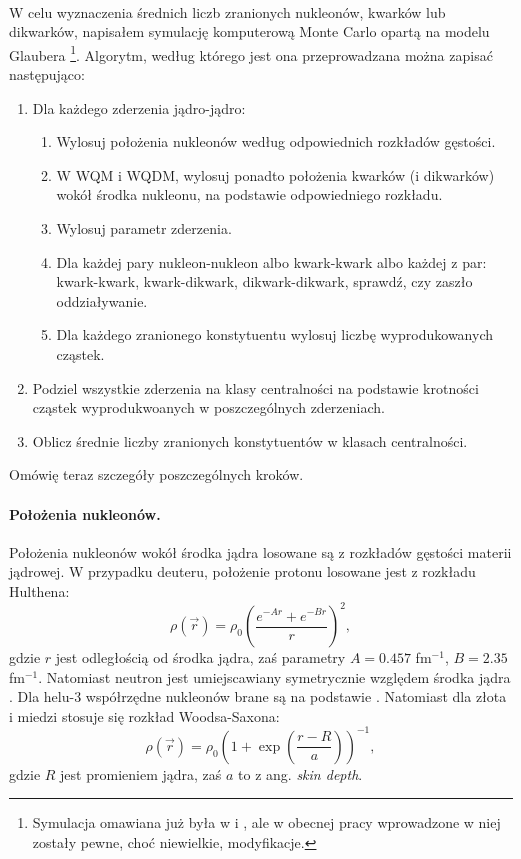 \documentclass[a4paper,12pt]{article}
\begin{document}
\paragraph{}
W celu wyznaczenia średnich liczb zranionych nukleonów, kwarków lub dikwarków, napisałem symulację komputerową Monte Carlo opartą na modelu Glaubera \cite{Loizides:2014vua} \footnote{Symulacja omawiana już była w \cite{Barej:pracaInz18} i \cite{Barej:2017kcw}, ale w obecnej pracy wprowadzone w niej zostały pewne, choć niewielkie, modyfikacje.}. Algorytm, według którego jest ona przeprowadzana można zapisać następująco:
\begin{enumerate}
	\item Dla każdego zderzenia jądro-jądro:
	\begin{enumerate}
		\item Wylosuj położenia nukleonów według odpowiednich rozkładów gęstości.
		\item W WQM i WQDM, wylosuj ponadto położenia kwarków (i dikwarków) wokół środka nukleonu, na podstawie odpowiedniego rozkładu.
		\item Wylosuj parametr zderzenia.
		\item Dla każdej pary nukleon-nukleon albo kwark-kwark albo każdej z par: kwark-kwark, kwark-dikwark, dikwark-dikwark, sprawdź, czy zaszło oddziaływanie.
		\item Dla każdego zranionego konstytuentu wylosuj liczbę wyprodukowanych cząstek.
	\end{enumerate}
	\item Podziel wszystkie zderzenia na klasy centralności na podstawie krotności cząstek wyprodukwoanych w poszczególnych zderzeniach.
	\item Oblicz średnie liczby zranionych konstytuentów w klasach centralności.
\end{enumerate}

Omówię teraz szczegóły poszczególnych kroków.

\paragraph{Położenia nukleonów.}
Położenia nukleonów wokół środka jądra losowane są z rozkładów gęstości materii jądrowej. W przypadku deuteru, położenie protonu losowane jest z rozkładu Hulthena:
\begin{equation}
\rho(\vec{r})=\rho_0 \left(\frac{e^{-Ar}+e^{-Br}}{r}\right)^2,
\end{equation}
gdzie $r$ jest odległością od środka jądra, zaś parametry $A=0.457$ fm$^{-1}$, $B=2.35$ fm$^{-1}$. Natomiast neutron jest umiejscawiany symetrycznie względem środka jądra \cite{hulthen,Loizides:2014vua}. Dla helu-3 współrzędne nukleonów brane są na podstawie \cite{Carlson:1997qn}. Natomiast dla złota i miedzi stosuje się rozkład Woodsa-Saxona:
\begin{equation}
\rho(\vec{r})=\rho_0 \left( 1 + \exp \left( \frac{r - R}{a}\right)\right)^{-1},
\end{equation}
gdzie $R$ jest promieniem jądra, zaś $a$ to z ang. \textit{skin depth}.
\end{document}
